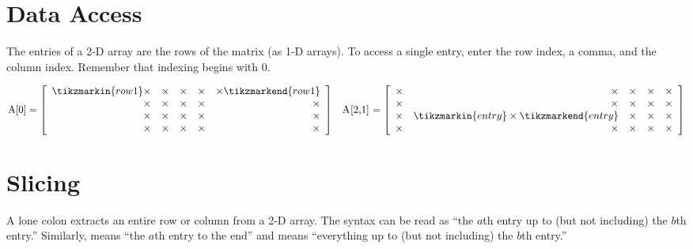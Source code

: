 \label{appendix:numpy-visual-guide}

\section*{Data Access} %

The entries of a 2-D array are the rows of the matrix (as 1-D arrays).
To access a single entry, enter the row index, a comma, and the column index.
Remember that indexing begins with $0$.

\begin{align*}
\text{\li{A[0]}} = \left[\begin{array}{rrrrr}
\tikzmarkin{row1}\times & \times & \times & \times & \times\tikzmarkend{row1}\\
\times & \times & \times & \times & \times\\
\times & \times & \times & \times & \times\\
\times & \times & \times & \times & \times\\
\end{array}\right]
&&
\text{\li{A[2,1]}} = \left[\begin{array}{rrrrr}
\times & \times & \times & \times & \times\\
\times & \times & \times & \times & \times\\
\times & \tikzmarkin{entry} \times \tikzmarkend{entry} & \times & \times & \times\\
\times & \times & \times & \times & \times
\end{array}\right]
\end{align*}

\section*{Slicing} %

A lone colon extracts an entire row or column from a 2-D array.
The syntax \li{[a:b]} can be read as ``the $a$th entry up to (but not including) the $b$th entry.''
Similarly, \li{[a:]} means ``the $a$th entry to the end'' and \li{[:b]} means ``everything up to (but not including) the $b$th entry.''

